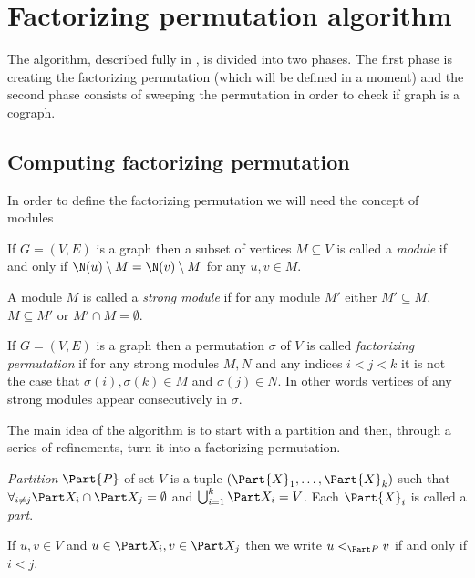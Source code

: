 \section{Factorizing permutation algorithm}\label{21-habib}

The algorithm, described fully in \cite{habib}, is divided into two phases. The first phase is creating the factorizing permutation (which will be defined in a moment) and the second phase consists of sweeping the permutation in order to check if graph is a cograph.

\subsection{Computing factorizing permutation}

In order to define the factorizing permutation we will need the concept of modules

\begin{defi}
    If $G=(V,E)$ is a graph then a subset of vertices $M \subseteq V$ is called a \emph{module} if and only if $\N(u)\setminus M = \N(v) \setminus M$ for any $u,v \in M$.

    A module $M$ is called a \emph{strong module} if for any module $M'$ either $M' \subseteq M$, $M \subseteq M'$ or $M' \cap M = \emptyset$.
\end{defi}

\begin{defi}
    If $G=(V,E)$ is a graph then a permutation $\sigma$ of $V$ is called \emph{factorizing permutation} if for any strong modules $M, N$ and any indices $i < j < k$ it is not the case that $\sigma(i), \sigma(k) \in M$ and $\sigma(j) \in N$. In other words vertices of any strong modules appear consecutively in $\sigma$.
\end{defi}

The main idea of the algorithm is to start with a partition and then, through a series of refinements, turn it into a factorizing permutation.

\begin{defi}
    \emph{Partition $\Part{P}$} of set $V$ is a tuple $(\Part{X}_1, \ldots, \Part{X}_k)$ such that $\forall_{i \neq j} \Part X_i \cap \Part X_j = \emptyset$ and $\bigcup_{i=1}^k \Part X_i = V$. Each $\Part{X}_i$ is called a \emph{part}.

    If $u,v \in V$ and $u \in \Part X_i, v \in \Part X_j$ then we write $u <_{\Part P} v$ if and only if $i < j$.
\end{defi}

